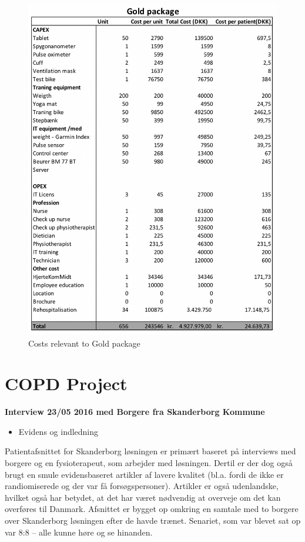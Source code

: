 \begin{figure}[H]
\centering
\includegraphics[width=1\textwidth]{Figure/Gold.png}
\caption{Costs relevant to Gold package}
\label{fig: Gold}
\end{figure} 


\chapter{COPD Project} \label{COPD}
\textbf{Interview 23/05 2016 med Borgere fra Skanderborg Kommune}

\begin{itemize}
	\item Evidens og indledning
\end{itemize}
Patientafsnittet for Skanderborg løsningen er primært baseret på interviews med borgere og en fysioterapeut, som arbejder med løsningen. Dertil er der dog også brugt en smule evidensbaseret artikler af lavere kvalitet (bl.a. fordi de ikke er randiomiserede og der var få forsøgspersoner). Artikler er også udenlandske, hvilket også har betydet, at det har været nødvendig at overveje om det kan overføres til Danmark. Afsnittet er bygget op omkring en samtale med to borgere over Skanderborg løsningen efter de havde trænet. Senariet, som var blevet sat op var 8:8 – alle kunne høre og se hinanden.

